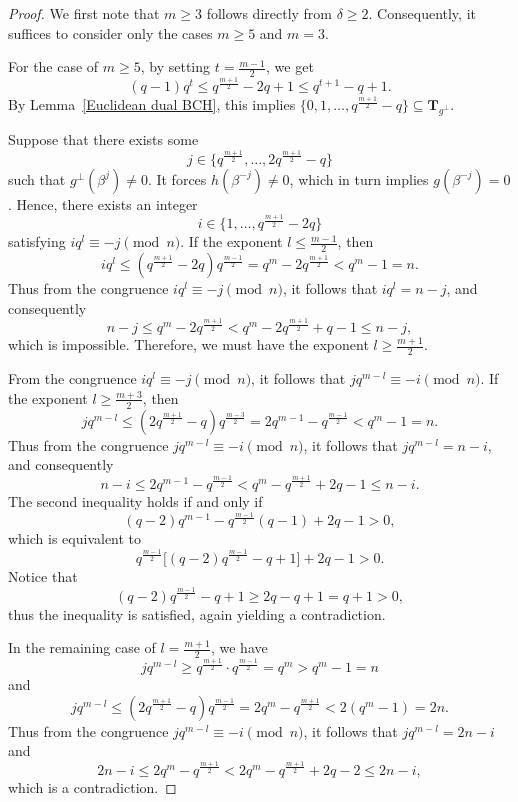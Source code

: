 \documentclass[journal,12pt,onecolumn]{IEEEtran}
\begin{document}
\begin{proof}
	We first note that $m \ge 3$ follows directly from $\delta \ge 2$. Consequently, it suffices to consider only the cases $m\ge 5$ and $m=3$.
	
	For the case of $m\ge 5$, by setting $t = \frac{m-1}{2}$, we get
	\[
	(q-1)q^t \le q^{\frac{m+1}{2}} - 2q + 1 \le q^{t+1} - q + 1.
	\]
	By Lemma~\ref{Euclidean dual BCH}, this implies
	\(
	\{0,1,\dots,q^{\frac{m+1}{2}} - q\} \subseteq \mathbf{T}_{g^\perp}.
	\)
	
	Suppose that there exists some
	\[
	j \in \{q^{\frac{m+1}{2}}, \dots, 2q^{\frac{m+1}{2}} - q\}
	\]
	such that $g^\perp(\beta^j) \ne 0$. It forces $h(\beta^{-j}) \ne 0$, which in turn implies $g(\beta^{-j}) = 0$. Hence, there exists an integer
	\[
	i \in \{1, \dots, q^{\frac{m+1}{2}} - 2q\}
	\]
	satisfying
	\(
	i q^l \equiv -j \pmod{n}
	\). If the exponent $l \le \frac{m-1}{2}$, then
	\[
	i q^l \le (q^{\frac{m+1}{2}} - 2q) q^{\frac{m-1}{2}}
	= q^m - 2q^{\frac{m+1}{2}}
	< q^m - 1 = n.
	\]
	Thus from the congruence $i q^l\equiv -j \pmod n$, it follows that $i q^l = n - j$, and consequently
	\[
	n - j \le q^m - 2q^{\frac{m+1}{2}}
	< q^m - 2q^{\frac{m+1}{2}} + q - 1
	\le n - j,
	\]
	which is impossible. Therefore, we must have the exponent $l \ge \frac{m+1}{2}$.
	
	From the congruence $i q^l \equiv -j \pmod{n}$, it follows that
	\(
	j q^{m-l} \equiv -i \pmod{n}.
	\)
	If the exponent $l \ge \frac{m+3}{2}$, then
	\[
	j q^{m-l} \le (2q^{\frac{m+1}{2}} - q) q^{\frac{m-3}{2}}
	= 2q^{m-1} - q^{\frac{m-1}{2}}
	< q^m - 1 = n.
	\]
	Thus from the congruence $j q^{m-l} \equiv -i \pmod{n}$, it follows that $j q^{m-l} = n - i$, and consequently
	\[
	n - i \le 2q^{m-1} - q^{\frac{m-1}{2}}
	< q^m - q^{\frac{m+1}{2}} + 2q - 1
	\le n - i.
	\]
	The second inequality holds if and only if
	\[
	(q-2)q^{m-1} - q^{\frac{m-1}{2}}(q-1) + 2q - 1 > 0,
	\]
	which is equivalent to
	\[
	q^{\frac{m-1}{2}} \big[(q-2)q^{\frac{m-1}{2}} - q + 1\big] + 2q - 1 > 0.
	\]
	Notice that
	\[
	(q-2)q^{\frac{m-1}{2}} - q + 1 \ge 2q - q + 1 = q + 1 > 0,
	\]
	thus the inequality is satisfied, again yielding a contradiction.
	
	In the remaining case of $l=\frac{m+1}{2}$, we have
	\[
	j q^{m-l} \ge q^{\frac{m+1}{2}} \cdot q^{\frac{m-1}{2}} = q^m > q^m - 1 = n
	\]
	and
	\[
	j q^{m-l} \le (2q^{\frac{m+1}{2}} - q) q^{\frac{m-1}{2}}
	= 2q^m - q^{\frac{m+1}{2}}
	< 2(q^m - 1) = 2n.
	\]
	Thus from the congruence $j q^{m-l} \equiv -i \pmod{n}$, it follows that $j q^{m-l} = 2n - i$ and
	\[
	2n - i \le 2q^m - q^{\frac{m+1}{2}}
	< 2q^m - q^{\frac{m+1}{2}} + 2q - 2
	\le 2n - i,
	\]
	which is a contradiction.
	

\end{proof}
\end{document}
